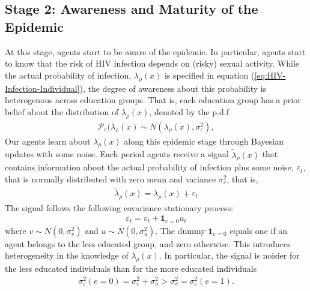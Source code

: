 \clearpage
\subsection*{\sf Stage 2: Awareness and Maturity of the Epidemic}

At this stage, agents start to be aware of the epidemic. In particular, agents start to know that the risk of HIV infection depends on (risky) sexual activity. While the actual probability of infection, $\lambda_\rho(x)$ is specified in equation (\ref{eq:HIV-Infection-Individual}), the degree of awareness about this probability is heterogenous across education groups. That is, each education group has a prior belief about the distribution of $\lambda_\rho(x)$, denoted by the p.d.f
\begin{align}
    \mathcal{P}_{e}(\lambda_\rho(x)\sim N(\lambda_\rho(x),\sigma^{2}_\varepsilon),
\end{align}
Our agents learn about $\lambda_\rho(x)$ along this epidemic stage through Bayesian updates with some noise. Each period agents receive a signal $\widetilde{\lambda}_\rho(x)$ that contains information about the actual probability of infection plus some noise, $\varepsilon_{t}$, that is normally distributed with zero mean and variance $\sigma^{2}_{\varepsilon}$, that is,
\begin{align}
   \widetilde{\lambda}_\rho(x)= \lambda_\rho(x) + \varepsilon_t %
\end{align}
The signal follows the following covariance stationary process:
\begin{align}
   \varepsilon_t= v_{t} + \textbf{1}_{e=0} u_t %
\end{align}
where $v\sim N(0,\sigma^{2}_v)$ and $u\sim N(0,\sigma^{2}_u)$. The dummy $\textbf{1}_{e=0}$ equals one if an agent belongs to the less educated group, and zero otherwise. This introduces heterogeneity in the knowledge of $\lambda_\rho(x)$. In particular, the signal is noisier for the less educated individuals than for the more educated individuals
\begin{align}\label{eq:noise}
    \sigma^{2}_{\varepsilon} (e=0) = \sigma^{2}_{v} + \sigma^{2}_{u} > \sigma^{2}_{v}=\sigma^{2}_{\varepsilon}(e=1).
\end{align}
